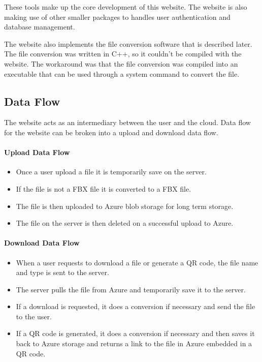     These tools make up the core development of this website. The website is also
    making use of other smaller packages to handles user authentication and database management.

    The website also implements the file conversion software that is described later.
    The file conversion was written in C++, so it couldn't be compiled with the website.
    The workaround was that the file conversion was compiled into an executable that can be used through a system command to convert the file.


    \subsection{Data Flow}
    The website acts as an intermediary between the user and the cloud. Data flow for the website can be broken into a upload and download data flow.

    \paragraph{Upload Data Flow}
    \begin{itemize}
        \item Once a user upload a file it is temporarily save on the server.
        \item If the file is not a FBX file it is converted to a FBX file.
        \item The file is then uploaded to Azure blob storage for long term storage.
        \item The file on the server is then deleted on a successful upload to Azure.
    \end{itemize}

    \paragraph{Download Data Flow}
    \begin{itemize}
        \item When a user requests to download a file or generate a QR code, the file name and type is sent to the server.
        \item The server pulls the file from Azure and temporarily save it to the server.
        \item If a download is requested, it does a conversion if necessary and send the file to the user.
        \item If a QR code is generated, it does a conversion if necessary and then saves it back to Azure storage and returns a link to the file in Azure embedded in a QR code.
    \end{itemize}


